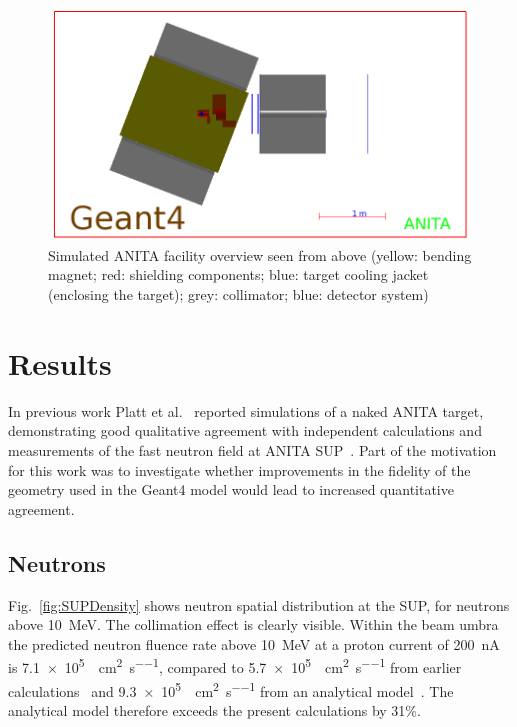 \documentclass[11pt,a4paper]{IEEEtran}
\let\MYoriglatexcaption\caption
\renewcommand{\caption}[2][\relax]{\MYoriglatexcaption[#2]{#2}}
\begin{document}
\begin{figure}[t]
	\centering
	\includegraphics[width=\columnwidth]{overview.png}
	\caption{
        Simulated ANITA facility overview seen from above (yellow: bending magnet; red: shielding components; blue: target cooling jacket (enclosing the target); grey: collimator; blue: detector system)
    }
	\label{fig:ANITAoverview}
\end{figure}

\section{Results}
In previous work Platt et al.~\cite{Platt2013} reported simulations of a naked ANITA target, demonstrating good qualitative agreement with independent calculations and measurements of the fast neutron field at ANITA SUP~\cite{Prokofiev2009}.
Part of the motivation for this work was to investigate whether improvements in the fidelity of the geometry used in the Geant4 model would lead to increased quantitative agreement.

\subsection{Neutrons}
Fig.~\ref{fig:SUPDensity} shows neutron spatial distribution at the SUP, for neutrons above \SI{10}{\MeV}.
The collimation effect is clearly visible.
Within the beam umbra the predicted neutron fluence rate above \SI{10}{\MeV} at a proton current of \SI{200}{\nA} is \SI{7.1e5}{\neutron\per\cm\squared\per\second}, compared to \SI{5.7e5}{\neutron\per\cm\squared\per\second} from earlier calculations~\cite{Platt2013} and \SI{9.3e5}{\neutron\per\cm\squared\per\second} from an analytical model~\cite{Prokofiev2009}.
The analytical model therefore exceeds the present calculations by 31\%.
\end{document}
